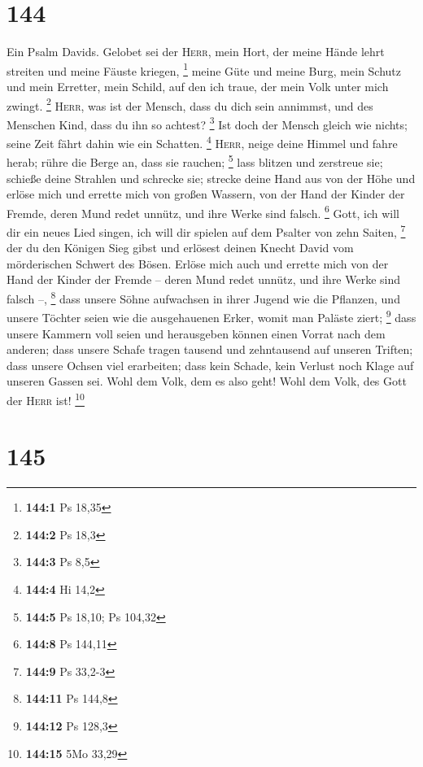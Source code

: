 \hypertarget{section-44}{%
\section{144}\label{section-44}}

 Ein Psalm Davids. Gelobet sei der \textsc{Herr}, mein
Hort, der meine Hände lehrt streiten und meine Fäuste kriegen,
\footnote{\textbf{144:1} Ps 18,35}  meine Güte und meine
Burg, mein Schutz und mein Erretter, mein Schild, auf den ich traue, der
mein Volk unter mich zwingt. \footnote{\textbf{144:2} Ps 18,3}
 \textsc{Herr}, was ist der Mensch, dass du dich sein
annimmst, und des Menschen Kind, dass du ihn so achtest? \footnote{\textbf{144:3}
  Ps 8,5}  Ist doch der Mensch gleich wie nichts; seine
Zeit fährt dahin wie ein Schatten. \footnote{\textbf{144:4} Hi 14,2}
 \textsc{Herr}, neige deine Himmel und fahre herab; rühre
die Berge an, dass sie rauchen; \footnote{\textbf{144:5} Ps 18,10; Ps
  104,32}  lass blitzen und zerstreue sie; schieße deine
Strahlen und schrecke sie;  strecke deine Hand aus von der
Höhe und erlöse mich und errette mich von großen Wassern, von der Hand
der Kinder der Fremde,  deren Mund redet unnütz, und ihre
Werke sind falsch. \footnote{\textbf{144:8} Ps 144,11} 
Gott, ich will dir ein neues Lied singen, ich will dir spielen auf dem
Psalter von zehn Saiten, \footnote{\textbf{144:9} Ps 33,2-3}
 der du den Königen Sieg gibst und erlösest deinen Knecht
David vom mörderischen Schwert des Bösen.  Erlöse mich
auch und errette mich von der Hand der Kinder der Fremde -- deren Mund
redet unnütz, und ihre Werke sind falsch --, \footnote{\textbf{144:11}
  Ps 144,8}  dass unsere Söhne aufwachsen in ihrer Jugend
wie die Pflanzen, und unsere Töchter seien wie die ausgehauenen Erker,
womit man Paläste ziert; \footnote{\textbf{144:12} Ps 128,3}
 dass unsere Kammern voll seien und herausgeben können
einen Vorrat nach dem anderen; dass unsere Schafe tragen tausend und
zehntausend auf unseren Triften;  dass unsere Ochsen viel
erarbeiten; dass kein Schade, kein Verlust noch Klage auf unseren Gassen
sei.  Wohl dem Volk, dem es also geht! Wohl dem Volk, des
Gott der \textsc{Herr} ist! \footnote{\textbf{144:15} 5Mo 33,29}

\hypertarget{section-45}{%
\section{145}\label{section-45}}

